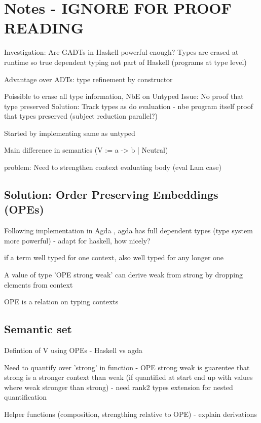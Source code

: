 
\section{Notes - IGNORE FOR PROOF READING}

Investigation: Are GADTs in Haskell powerful enough? Types are erased at runtime so true dependent typing not part of Haskell (programs at type level)

Advantage over ADTs: type refinement by constructor

Poissible to erase all type information, NbE on Untyped
Issue: No proof that type preserved 
Solution: Track types as do evaluation - nbe program itself proof that types preserved (subject reduction parallel?)

Started by implementing same as untyped

Main difference in semantics (V := a -> b | Neutral) 
\cite{slides}

problem: Need to strengthen context evaluating body (eval Lam case)
\subsection{Solution: Order Preserving Embeddings (OPEs)}

Following implementation in Agda \cite{AgdaNbe}, agda has full dependent types (type system more powerful) - adapt for haskell, how nicely? 

if a term well typed for one context, also well typed for any longer one

A value of type 'OPE strong weak' can derive weak from strong by dropping elements from context

OPE is a relation on typing contexts

\subsection{Semantic set}

Defintion of V using OPEs - Haskell vs agda

Need to quantify over 'strong' in function - OPE strong weak is guarentee that strong is a stronger context than weak (if quantified at start end up with values where weak stronger than strong) - need rank2 types extension for nested quantification

Helper functions (composition, strengthing relative to OPE) - explain derivations

